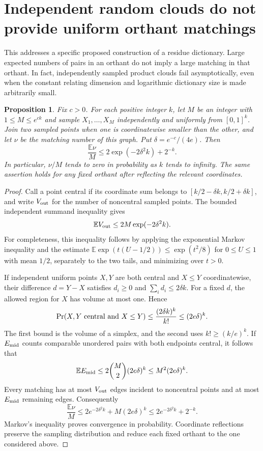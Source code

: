 \documentclass[11pt]{article}
\newtheorem{proposition}{Proposition}
\begin{document}
\section{Independent random clouds do not provide uniform orthant matchings}

This addresses a specific proposed construction of a residue dictionary.
Large expected numbers of pairs in an orthant do not imply a large
matching in that orthant. In fact, independently sampled product clouds
fail asymptotically, even when the constant relating dimension and
logarithmic dictionary size is made arbitrarily small.

\begin{proposition}
Fix $c>0$. For each positive integer $k$, let $M$ be an integer with
$1\leq M\leq e^{ck}$ and
sample $X_1,\ldots,X_M$ independently and uniformly from $[0,1]^k$.
Join two sampled points when one is coordinatewise smaller than the
other, and let $\nu$ be the matching number of this graph. Put
$\delta=e^{-c}/(4e)$. Then
\[
 \frac{\mathbb E\nu}{M}
 \leq 2\exp(-2\delta^2 k)+2^{-k}.
\]
In particular, $\nu/M$ tends to zero in probability as $k$ tends
to infinity. The same assertion holds for any fixed orthant after
reflecting the relevant coordinates.
\end{proposition}
\begin{proof}
Call a point central if its coordinate sum belongs to
$[k/2-\delta k,k/2+\delta k]$, and write $V_{\rm out}$ for the
number of noncentral sampled points. The bounded independent
summand inequality gives
\[
 \mathbb E V_{\rm out}\leq 2M\exp(-2\delta^2 k).
\]
For completeness, this inequality follows by applying the exponential
Markov inequality and the estimate
$\mathbb E\exp(t(U-1/2))\leq\exp(t^2/8)$ for
$0\leq U\leq1$ with mean $1/2$, separately to the two tails,
and minimizing over $t>0$.

If independent uniform points $X,Y$ are both central and $X\leq Y$
coordinatewise, their difference $d=Y-X$ satisfies $d_i\geq0$ and
$\sum_i d_i\leq2\delta k$. For a fixed $d$, the allowed region
for $X$ has volume at most one. Hence
\[
 \Pr(X,Y\hbox{ central and }X\leq Y)
 \leq \frac{(2\delta k)^k}{k!}
 \leq (2e\delta)^k.
\]
The first bound is the volume of a simplex, and the second uses
$k!\geq(k/e)^k$. If $E_{\rm mid}$ counts comparable unordered
pairs with both endpoints central, it follows that
\[
 \mathbb E E_{\rm mid}
 \leq 2\binom{M}{2}(2e\delta)^k
 \leq M^2(2e\delta)^k.
\]
Every matching has at most $V_{\rm out}$ edges incident to
noncentral points and at most $E_{\rm mid}$ remaining edges.
Consequently
\[
 \frac{\mathbb E\nu}{M}
 \leq2e^{-2\delta^2k}+M(2e\delta)^k
 \leq2e^{-2\delta^2k}+2^{-k}.
\]
Markov's inequality proves convergence in probability. Coordinate
reflections preserve the sampling distribution and reduce each fixed
orthant to the one considered above.
\end{proof}
\end{document}
